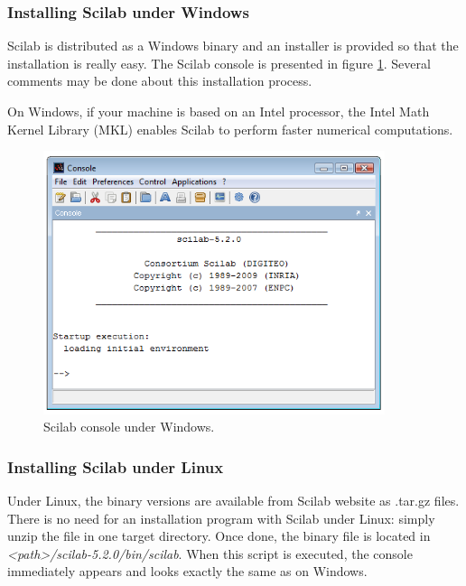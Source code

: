 \subsubsection{Installing Scilab under Windows}

Scilab is distributed as a Windows binary and an installer is provided
so that the installation is really easy.
The Scilab console is presented in figure \ref{fig-win32-scilab-console}. 
Several comments may be done about this installation process. 

On Windows, if your machine is based on an Intel processor, the Intel 
Math Kernel Library (MKL) \cite{IntelMKLWWW} enables Scilab to perform 
faster numerical computations. 

\begin{figure}
\begin{center}
\includegraphics[width=10cm]{introscilab/win32-scilab-console-5-2-0.png}
\end{center}
\caption{Scilab console under Windows.}
\label{fig-win32-scilab-console}
\end{figure}

\subsubsection{Installing Scilab under Linux}

Under Linux, the binary versions are available from Scilab 
website as .tar.gz files. There is no need for an installation 
program with Scilab under Linux: simply unzip the file in one target 
directory. Once done, the binary file is located in \emph{<path>/scilab-5.2.0/bin/scilab}.
When this script is executed, the console immediately appears and looks 
exactly the same as on Windows.

